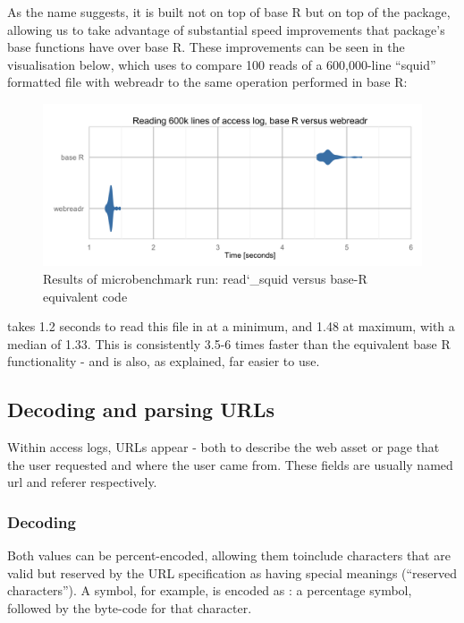As the name suggests, it is built not on top of base R but on top of the
 \citep{readr} package, allowing us to take advantage of
substantial speed improvements that package's base functions have over
base R. These improvements can be seen in the visualisation below, which
uses  \citep{microbenchmark} to compare 100
reads of a 600,000-line ``squid'' formatted file with webreadr to the
same operation performed in base R:

\begin{figure}[h]
    \centering
    \includegraphics[width=14cm,keepaspectratio]{reading_benchmarks-jay}
    \caption{Results of microbenchmark run: read\char`_squid versus base-R equivalent code}
\end{figure}

 takes 1.2 seconds to read this file in at a minimum, and
1.48 at maximum, with a median of 1.33. This is consistently 3.5-6 times
faster than the equivalent base R functionality - and is also, as
explained, far easier to use.

\subsection{Decoding and parsing URLs}\label{decoding-and-parsing-urls}

Within access logs, URLs appear - both to describe the web asset or page
that the user requested and where the user came from. These fields are
usually named url and referer respectively.

\subsubsection{Decoding}\label{decoding}

Both values can be percent-encoded, allowing them toinclude characters
that are valid but reserved by the URL specification as having special
meanings (``reserved characters''). A \samp{\#} symbol, for example, is
encoded as : a percentage symbol, followed by the byte-code
for that character.

